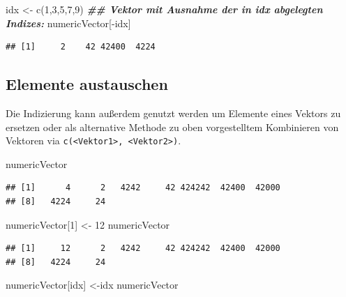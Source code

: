 \documentclass[
]{book}
\newenvironment{Shaded}{\begin{snugshade}}{\end{snugshade}}
\newcommand{\DecValTok}[1]{\textcolor[rgb]{0.00,0.00,0.81}{#1}}
\newcommand{\DocumentationTok}[1]{\textcolor[rgb]{0.56,0.35,0.01}{\textbf{\textit{#1}}}}
\newcommand{\FunctionTok}[1]{\textcolor[rgb]{0.00,0.00,0.00}{#1}}
\newcommand{\NormalTok}[1]{#1}
\newcommand{\OtherTok}[1]{\textcolor[rgb]{0.56,0.35,0.01}{#1}}
\newcommand{\SpecialCharTok}[1]{\textcolor[rgb]{0.00,0.00,0.00}{#1}}
\begin{document}
\begin{Shaded}
\begin{Highlighting}[]
\NormalTok{idx }\OtherTok{\textless{}{-}} \FunctionTok{c}\NormalTok{(}\DecValTok{1}\NormalTok{,}\DecValTok{3}\NormalTok{,}\DecValTok{5}\NormalTok{,}\DecValTok{7}\NormalTok{,}\DecValTok{9}\NormalTok{)}
\DocumentationTok{\#\# Vektor mit Ausnahme der in idx abgelegten Indizes:}
\NormalTok{numericVector[}\SpecialCharTok{{-}}\NormalTok{idx]}
\end{Highlighting}
\end{Shaded}

\begin{verbatim}
## [1]     2    42 42400  4224
\end{verbatim}

\hypertarget{elemente-austauschen}{%
\subsection{Elemente austauschen}\label{elemente-austauschen}}

Die Indizierung kann außerdem genutzt werden um Elemente eines Vektors zu ersetzen oder als alternative Methode zu oben vorgestelltem Kombinieren von Vektoren via \texttt{c(\textless{}Vektor1\textgreater{},\ \textless{}Vektor2\textgreater{})}.

\begin{Shaded}
\begin{Highlighting}[]
\NormalTok{numericVector}
\end{Highlighting}
\end{Shaded}

\begin{verbatim}
## [1]      4      2   4242     42 424242  42400  42000
## [8]   4224     24
\end{verbatim}

\begin{Shaded}
\begin{Highlighting}[]
\NormalTok{numericVector[}\DecValTok{1}\NormalTok{] }\OtherTok{\textless{}{-}} \DecValTok{12}
\NormalTok{numericVector}
\end{Highlighting}
\end{Shaded}

\begin{verbatim}
## [1]     12      2   4242     42 424242  42400  42000
## [8]   4224     24
\end{verbatim}

\begin{Shaded}
\begin{Highlighting}[]
\NormalTok{numericVector[idx] }\OtherTok{\textless{}{-}}\NormalTok{idx}
\NormalTok{numericVector}
\end{Highlighting}
\end{Shaded}
\end{document}
